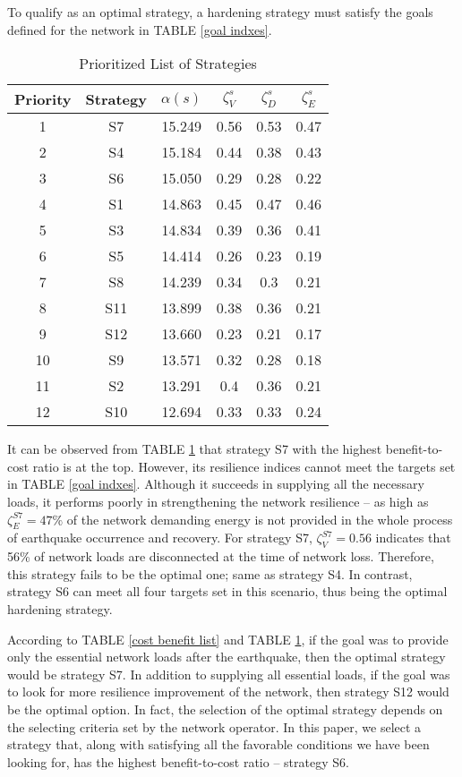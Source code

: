 \documentclass[conference]{IEEEtran}
\begin{document}
To qualify as an optimal strategy, a hardening strategy must satisfy the goals defined for the network in TABLE \ref{goal indxes}. \begin{table}[!htb]
    \centering
    \caption{\label{priority list}Prioritized List of Strategies}
    \begin{tabular}{c c c c c c}
    \hline
    Priority & Strategy & $\alpha(s)$ &$\zeta_V^s$ & $\zeta_D^s$ & $\zeta_E^s$\\
    \hline
     1 & S7 & 15.249 & 0.56 & 0.53 & 0.47\\
     2 & S4 &15.184 &0.44 &0.38 &0.43 \\
     3 &S6 &15.050 &0.29 &0.28 &0.22\\
     4 &S1 &14.863 &0.45 &0.47 &0.46\\
     5 &S3 &14.834 &0.39 &0.36 &0.41\\
     6 &S5 &14.414 &0.26 &0.23 &0.19\\
     7 &S8 &14.239 &0.34 &0.3 &0.21 \\
     8 &S11 &13.899 &0.38 &0.36 &0.21\\
     9 &S12 &13.660 &0.23 &0.21 &0.17 \\
     10 &S9 &13.571 &0.32 &0.28 &0.18\\
     11 &S2 &13.291 &0.4 &0.36 &0.21 \\
     12 &S10 &12.694 &0.33 &0.33 &0.24\\
     \hline
    \end{tabular}
\end{table}It can be observed from TABLE \ref{priority list} that strategy S7 with the highest benefit-to-cost ratio is at the top. However, its resilience indices cannot meet the targets set in TABLE \ref{goal indxes}. Although it succeeds in supplying all the necessary loads, it performs poorly in strengthening the network resilience -- as high as $\zeta_E^{S7}=47\%$ of the network demanding energy is not provided in the whole process of earthquake occurrence and recovery. For strategy S7, $\zeta_V^{S7}=0.56$ indicates that 56\% of network loads are disconnected at the time of network loss. Therefore, this strategy fails to be the optimal one; same as strategy S4. In contrast, strategy S6 can meet all four targets set in this scenario, thus being the optimal hardening strategy. 

According to TABLE \ref{cost benefit list} and TABLE \ref{priority list}, if the goal was to provide only the essential network loads after the earthquake, then the optimal strategy would be strategy S7. In addition to supplying all essential loads, if the goal was to look for more resilience improvement of the network, then strategy S12 would be the optimal option. In fact, the selection of the optimal strategy depends on the selecting criteria set by the network operator. In this paper, we select a strategy that, along with satisfying all the favorable conditions we have been looking for, has the highest benefit-to-cost ratio -- strategy S6. 
\end{document}
